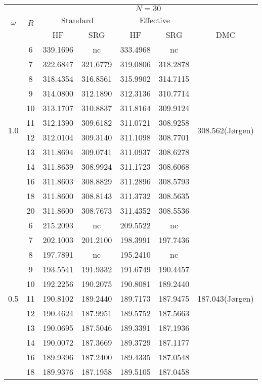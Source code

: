 \begin{table}
\begin{center}
\tabcolsep=0.35cm
\begin{tabular}{|c|c|c|c|c|c|c|}
\hline
\multirow{3}{*}{$\omega$} & \multirow{3}{*}{$R$} & \multicolumn{5}{|c|}{$N=30$} \\
& & \multicolumn{2}{|c|}{Standard} & \multicolumn{2}{|c|}{Effective} &  \\
& & HF & SRG & HF & SRG & DMC \\
\hline\hline
\multirow{12}{*}{1.0} & 6&339.1696 &nc &333.4968 &nc & \multirow{12}{*}{308.562(J{\o}rgen)} \\
& 7&322.6847 &321.6779 &319.0806 &318.2878 & \\
& 8&318.4354 &316.8561 &315.9902 &314.7115 & \\
& 9&314.0800 &312.1890 &312.3136 &310.7714 & \\
& 10&313.1707 &310.8837 &311.8164 & 309.9124 & \\
& 11& 312.1390 &309.6182 &311.0721 &308.9258 & \\
&12 &312.0104 &309.3140 &311.1098 &308.7701 & \\
&13 &311.8694 &309.0741 & 311.0937 &308.6278 & \\
&14 & 311.8639 &308.9924 &311.1723 &308.6068 & \\
&16 &311.8603 &308.8829 &311.2896 &308.5793 & \\
& 18&311.8600 &308.8143 &311.3732 &308.5635 & \\
&20 &311.8600 & 308.7673 &311.4352 &308.5536 & \\
\hline
\multirow{12}{*}{0.5} & 6&215.2093 & nc& 209.5522 &nc & \multirow{12}{*}{187.043(J{\o}rgen)} \\
& 7&202.1003 &201.2100  &198.3991 &197.7436 & \\
& 8&197.7891 &nc &195.2410 &nc & \\
& 9&193.5541 &191.9332 &191.6749 &190.4457 & \\
& 10&192.2256 &190.2075 &190.8081 &189.2440 & \\
& 11&190.8102 &189.2440 &189.7173 &187.9475 & \\ 
&12 &190.4624 &187.9951 &189.5752 &187.5663 & \\
&13 &190.0695 &187.5046 &189.3391 & 187.1936& \\
&14 &190.0072 &187.3669 &189.3729 &187.1177 & \\
&16 &189.9396 & 187.2400&189.4335 &187.0548 & \\
& 18&189.9376 &187.1958 &189.5105 &187.0458 & \\

\end{tabular}
\end{center}
\end{table}
